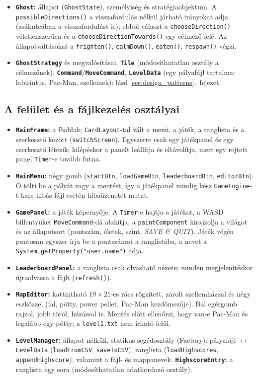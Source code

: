 \documentclass[11pt, a4paper]{article}
\begin{document}
\begin{itemize}[itemsep=2pt]
    \item \textbf{\texttt{Ghost}:} állapot (\texttt{GhostState}), személyiség és stratégiaobjektum. A \texttt{possibleDirections()} a visszafordulás nélkül járható irányokat adja (zsákutcában a visszafordulást is); ebből választ a \texttt{chooseDirection()} véletlenszerűen és a \texttt{chooseDirectionTowards()} egy célmező felé. Az állapotváltásokat a \texttt{frighten()}, \texttt{calmDown()}, \texttt{eaten()}, \texttt{respawn()} végzi.
    \item \textbf{\texttt{GhostStrategy}} és megvalósításai, \textbf{\texttt{Tile}} (módosíthatatlan osztály a célmezőnek), \textbf{\texttt{Command}}/\textbf{\texttt{MoveCommand}}, \textbf{\texttt{LevelData}} (egy pályafájl tartalma: labirintus, Pac-Man, szellemek): lásd \ref{sec:design_patterns}.~fejezet.
\end{itemize}

\subsection*{A felület és a fájlkezelés osztályai}
\begin{itemize}[itemsep=2pt]
    \item \textbf{\texttt{MainFrame}:} a főablak; \texttt{CardLayout}-tal vált a menü, a játék, a ranglista és a szerkesztő között (\texttt{switchScreen}). Egyszerre csak egy játékpanel és egy szerkesztő létezik; kilépéskor a panelt leállítja és eltávolítja, mert egy rejtett panel \texttt{Timer}-e tovább futna.
    \item \textbf{\texttt{MainMenu}:} négy gomb (\texttt{startBtn}, \texttt{loadGameBtn}, \texttt{leaderboardBtn}, \texttt{editorBtn}). Ő tölti be a pályát vagy a mentést, így a játékpanel mindig kész \texttt{GameEngine}-t kap; hibás fájl esetén hibaüzenetet mutat.
    \item \textbf{\texttt{GamePanel}:} a játék képernyője. A \texttt{Timer}-e hajtja a játékot, a WASD billentyűket \texttt{MoveCommand}-dá alakítja, a \texttt{paintComponent} kirajzolja a világot és az állapotsort (pontszám, életek, szint, \textit{SAVE \& QUIT}). Játék végén pontosan egyszer írja be a pontszámot a ranglistába, a nevet a \texttt{System.getProperty("user.name")} adja.
    \item \textbf{\texttt{LeaderboardPanel}:} a ranglista csak olvasható nézete; minden megjelenítéskor újraolvassa a fájlt (\texttt{refresh()}).
    \item \textbf{\texttt{MapEditor}:} kattintható $19 \times 21$-es rács rögzített, zárolt szellemházzal és négy eszközzel (fal, pötty, power pellet, Pac-Man kezdőmezője). Bal egérgomb rajzol, jobb töröl, húzással is. Mentés előtt ellenőrzi, hogy van-e Pac-Man és legalább egy pötty; a \texttt{level1.txt} nem írható felül.
    \item \textbf{\texttt{LevelManager}:} állapot nélküli, statikus segédosztály (Factory): pályafájl $\leftrightarrow$ \texttt{LevelData} (\texttt{loadFromCSV}, \texttt{saveToCSV}), ranglista (\texttt{loadHighscores}, \texttt{appendHighscore}), valamint a fájl- és mappanevek. \textbf{\texttt{HighscoreEntry}:} a ranglista egy sora (módosíthatatlan adathordozó osztály).
\end{itemize}
\end{document}
